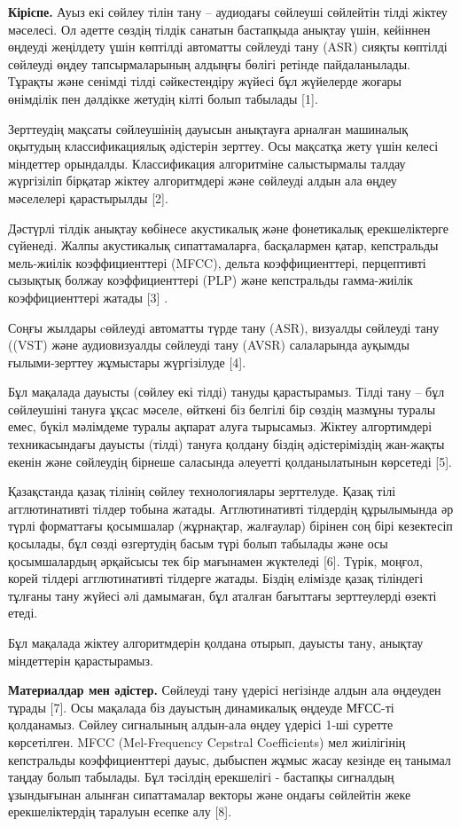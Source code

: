 \begin{multicols}{2}
{\bfseries Кіріспе.} Ауыз екі сөйлеу тілін тану -- аудиодағы сөйлеуші
сөйлейтін тілді жіктеу мәселесі. Ол әдетте сөздің тілдік санатын
бастапқыда анықтау үшін, кейіннен өңдеуді жеңілдету үшін көптілді
автоматты сөйлеуді тану (ASR) сияқты көптілді сөйлеуді өңдеу
тапсырмаларының алдыңғы бөлігі ретінде пайдаланылады. Тұрақты және
сенімді тілді сәйкестендіру жүйесі бұл жүйелерде жоғары өнімділік пен
дәлдікке жетудің кілті болып табылады {[}1{]}.

Зерттеудің мақсаты сөйлеушінің дауысын анықтауға арналған машиналық
оқытудың классификациялық әдістерін зерттеу. Осы мақсатқа жету үшін
келесі міндеттер орындалды. Классификация алгоритміне салыстырмалы
талдау жүргізіліп бірқатар жіктеу алгоритмдері және сөйлеуді алдын ала
өңдеу мәселелері қарастырылды {[}2{]}.

Дәстүрлі тілдік анықтау көбінесе акустикалық және фонетикалық
ерекшеліктерге сүйенеді. Жалпы акустикалық сипаттамаларға, басқалармен
қатар, кепстральды мель-жиілік коэффициенттері (MFCC), дельта
коэффициенттері, перцептивті сызықтық болжау коэффициенттері (PLP) және
кепстральды гамма-жиілік коэффициенттері жатады {[}3{]} .

Соңғы жылдары cөйлеуді автоматты түрде тану (ASR), визуалды сөйлеуді
тану ((VST) және аудиовизуалды сөйлеуді тану (AVSR) салаларында ауқымды
ғылыми-зерттеу жұмыстары жүргізілуде {[}4{]}.

Бұл мақалада дауысты (сөйлеу екі тілді) тануды қарастырамыз. Тілді тану
-- бұл сөйлеушіні тануға ұқсас мәселе, өйткені біз белгілі бір сөздің
мазмұны туралы емес, бүкіл мәлімдеме туралы ақпарат алуға тырысамыз.
Жіктеу алгортимдері техникасындағы дауысты (тілді) тануға қолдану біздің
әдістеріміздің жан-жақты екенін және сөйлеудің бірнеше саласында
әлеуетті қолданылатынын көрсетеді {[}5{]}.

Қазақстанда қазақ тілінің сөйлеу технологиялары зерттелуде. Қазақ тілі
агглютинативті тілдер тобына жатады. Агглютинативті тілдердің
құрылымында әр түрлі форматтағы қосымшалар (жұрнақтар, жалғаулар)
бірінен соң бірі кезектесіп қосылады, бұл сөзді өзгертудің басым түрі
болып табылады және осы қосымшалардың әрқайсысы тек бір мағынамен
жүктеледі {[}6{]}. Түрік, моңғол, корей тілдері агглютинативті тілдерге
жатады. Біздің елімізде қазақ тіліндегі тұлғаны тану жүйесі әлі
дамымаған, бұл аталған бағыттағы зерттеулерді өзекті етеді.

Бұл мақалада жіктеу алгоритмдерін қолдана отырып, дауысты тану, анықтау
міндеттерін қарастырамыз.

{\bfseries Материалдар мен әдістер.} Сөйлеуді тану үдерісі негізінде
алдын ала өңдеуден тұрады {[}7{]}. Осы мақалада біз дауыстың динамикалық
өңдеуде МҒСС-ті қолданамыз. Сөйлеу сигналының алдын-ала өңдеу үдерісі
1-ші суретте көрсетілген. MFCC (Mel-Frequency Cepstral Coefficients) мел
жиілігінің кепстральды коэффициенттері дауыс, дыбыспен жұмыс жасау
кезінде ең танымал таңдау болып табылады. Бұл тәсілдің ерекшелігі -
бастапқы сигналдың ұзындығынан алынған сипаттамалар векторы және ондағы
сөйлейтін жеке ерекшеліктердің таралуын есепке алу {[}8{]}.
\end{multicols}


